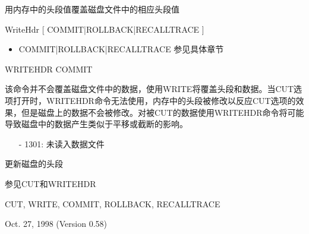 \label{cmd:writehdr}

用内存中的头段值覆盖磁盘文件中的相应头段值

WriteHdr [ COMMIT|ROLLBACK|RECALLTRACE ]

\begin{itemize}
\item COMMIT|ROLLBACK|RECALLTRACE 参见具体章节
\end{itemize}

WRITEHDR COMMIT

该命令并不会覆盖磁盘文件中的数据，使用WRITE将覆盖头段和数据。当CUT选项打开时，WRITEHDR命令无法使用，内存中的头段被修改以反应CUT选项的效果，但是磁盘上的数据不会被修改。对被CUT的数据使用WRITEHDR命令将可能导致磁盘中的数据产生类似于平移或截断的影响。

\begin{itemize}
\item[-]1301: 未读入数据文件
\end{itemize}

更新磁盘的头段

参见CUT和WRITEHDR

CUT, WRITE, COMMIT, ROLLBACK, RECALLTRACE

Oct. 27, 1998 (Version 0.58)
